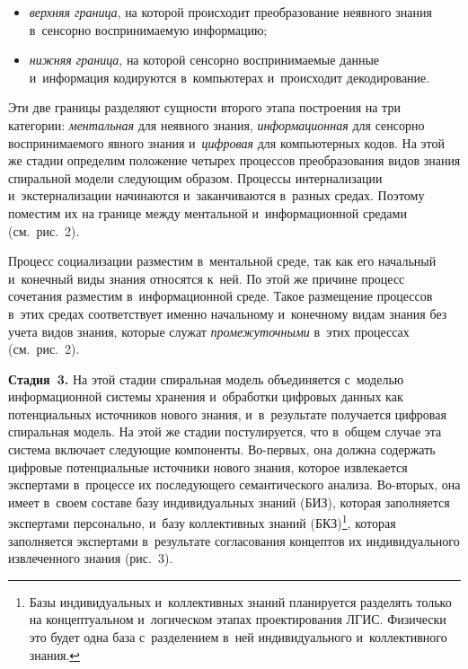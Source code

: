 \begin{multicols}{2}
\begin{itemize}
  \item \textit{верхняя граница}, на которой происходит преобразование 
неявного знания в~сенсорно вос\-при\-ни\-ма\-емую информацию;
  \item \textit{нижняя граница}, на которой сенсорно вос\-при\-ни\-ма\-емые данные 
и~информация кодируются в~компьютерах и~происходит декодирование.
  \end{itemize}
  
  Эти две границы разделяют сущности второго этапа построения на три 
категории: \textit{ментальная} для неявного знания, \textit{информационная} 
для сенсорно вос\-при\-ни\-ма\-емо\-го явного знания и~\textit{цифровая} для 
компьютерных кодов. На этой же стадии определим положение четырех 
процессов преобразования видов знания спиральной модели сле\-ду\-ющим 
образом. Процессы интернализации и~экстернализации начинаются 
и~заканчиваются в~разных средах. Поэтому поместим их на границе между 
ментальной и~информационной средами (см.\ рис.~2).
  



  Процесс социализации разместим в~ментальной среде, так как его начальный и~конечный виды знания относятся к~ней. По этой же причине процесс 
сочетания разместим в~информационной среде. Такое размещение процессов 
в~этих средах соответствует именно начальному и~конечному видам знания без 
учета видов знания, которые служат \textit{промежуточными} в~этих 
процессах (см.\ рис.~2). 
  
\textbf{Стадия~3.} На этой стадии спиральная модель объединяется 
 с~мо\-делью информационной сис\-те\-мы хранения и~обработки циф\-ро\-вых данных как потенциальных 
источников нового знания, и~в~результате получается цифровая спиральная модель. На этой же стадии 
постулируется, что в~общем случае эта сис\-те\-ма включает сле\-ду\-ющие компоненты. Во-пер\-вых, она должна 
содержать циф\-ро\-вые потенциальные источники нового знания, которое извлекается экспертами в~процессе 
их по\-сле\-ду\-юще\-го семантического анализа. Во-вто\-рых, она имеет в~своем составе базу индивидуальных 
знаний (БИЗ), которая заполняется экспертами персонально, и~базу коллективных знаний (БКЗ)\footnote{Базы индивидуальных и~коллективных знаний 
планируется разделять только на концептуальном и~логическом этапах проектирования 
ЛГИС. Физически это будет одна база с~разделением в~ней 
индивидуального и~коллективного знания.}, которая заполняется экспертами в~результате согласования 
концептов их индивидуального извлеченного знания (рис.~3).




\end{multicols}
